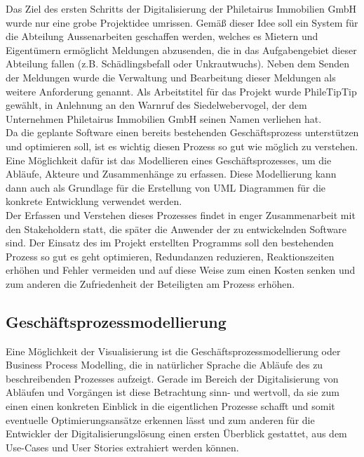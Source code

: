 Das Ziel des ersten Schritts der Digitalisierung der Philetairus Immobilien GmbH wurde nur eine grobe Projektidee umrissen. Gemäß dieser Idee soll ein System für die Abteilung Aussenarbeiten geschaffen werden, welches es Mietern und Eigentümern ermöglicht Meldungen abzusenden, die in das Aufgabengebiet dieser Abteilung fallen (z.B. Schädlingsbefall oder Unkrautwuchs). Neben dem Senden der Meldungen wurde die Verwaltung und Bearbeitung dieser Meldungen als weitere Anforderung genannt. Als Arbeitstitel für das Projekt wurde PhileTipTip gewählt, in Anlehnung an den Warnruf des Siedelwebervogel, der dem Unternehmen Philetairus Immobilien GmbH seinen Namen verliehen hat.\\

Da die geplante Software einen bereits bestehenden Geschäftsprozess unterstützen und optimieren soll, ist es wichtig diesen Prozess so gut wie möglich zu verstehen. Eine Möglichkeit dafür ist das Modellieren eines Geschäftsprozesses, um die Abläufe, Akteure und Zusammenhänge zu erfassen. Diese Modellierung kann dann auch als Grundlage für die Erstellung von UML Diagrammen  für die konkrete Entwicklung verwendet werden.\\

Der Erfassen und Verstehen dieses Prozesses findet in enger Zusammenarbeit mit den Stakeholdern statt, die später die Anwender der zu entwickelnden Software sind. Der Einsatz des im Projekt erstellten Programms soll den bestehenden Prozess so gut es geht optimieren, Redundanzen reduzieren, Reaktionszeiten erhöhen und Fehler vermeiden und auf diese Weise zum einen Kosten senken und zum anderen die Zufriedenheit der Beteiligten am Prozess erhöhen.\\

\newpage

\subsection{Geschäftsprozessmodellierung}

Eine Möglichkeit der Visualisierung ist die Geschäftsprozessmodellierung oder Business Process Modelling, die in natürlicher Sprache die Abläufe des zu beschreibenden Prozesses aufzeigt. Gerade im Bereich der Digitalisierung von Abläufen und Vorgängen ist diese Betrachtung sinn- und wertvoll, da sie zum einen einen konkreten Einblick in die eigentlichen Prozesse schafft und somit eventuelle Optimierungsansätze erkennen lässt und zum anderen für die Entwickler der Digitalisierungslösung einen ersten Überblick gestattet, aus dem Use-Cases und User Stories extrahiert werden können.\\

